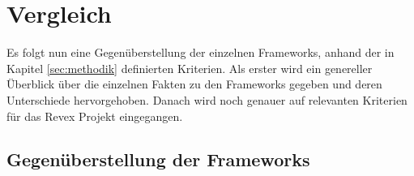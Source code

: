 \chapter{Vergleich}
\label{sec:comparison}
Es folgt nun eine Gegenüberstellung der einzelnen Frameworks, anhand der in Kapitel \ref{sec:methodik} definierten Kriterien. Als erster wird ein genereller Überblick über die einzelnen Fakten zu den Frameworks gegeben und deren Unterschiede hervorgehoben. Danach wird noch genauer auf relevanten Kriterien für das Revex Projekt eingegangen.

\section{Gegenüberstellung der Frameworks}


